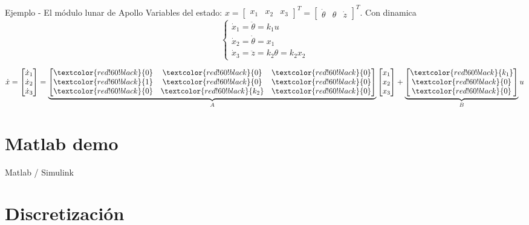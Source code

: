 \documentclass[presentation,aspectratio=1610]{beamer}
\begin{document}
\begin{frame}[label={sec:org7d2985d}]{Ejemplo - El módulo lunar de Apollo}
Variables del estado: \(x = \begin{bmatrix} x_1 & x_2 & x_3 \end{bmatrix}^T = \begin{bmatrix} \dot{\theta} & \theta & \dot{z} \end{bmatrix}^T\). Con dinamica
\[ \begin{cases} \dot{x}_1 =  \ddot{\theta} = k_1 u\\ \dot{x}_2 = \dot{\theta} = x_1\\ \dot{x}_3 = \ddot{z} = k_2\theta = k_2x_2 \end{cases} \]

\[ \dot{x} = \begin{bmatrix} \dot{x}_1\\\dot{x}_2\\\dot{x}_3\end{bmatrix} = \underbrace{\begin{bmatrix} \textcolor{red!60!black}{0} & \textcolor{red!60!black}{0} &\textcolor{red!60!black}{0} \\\textcolor{red!60!black}{1} & \textcolor{red!60!black}{0}& \textcolor{red!60!black}{0}\\ \textcolor{red!60!black}{0}& \textcolor{red!60!black}{k_2} &\textcolor{red!60!black}{0} \end{bmatrix}}_{A} \begin{bmatrix} x_1\\x_2\\x_3\end{bmatrix} + \underbrace{\begin{bmatrix} \textcolor{red!60!black}{k_1} \\ \textcolor{red!60!black}{0} \\\textcolor{red!60!black}{0}  \end{bmatrix}}_{B} u \]
\end{frame}


\section{Matlab demo}
\label{sec:orgbce559a}
\begin{frame}[label={sec:orgb03c156}]{Matlab / Simulink}
\end{frame}

\section{Discretización}
\label{sec:org42dd400}
\end{document}
